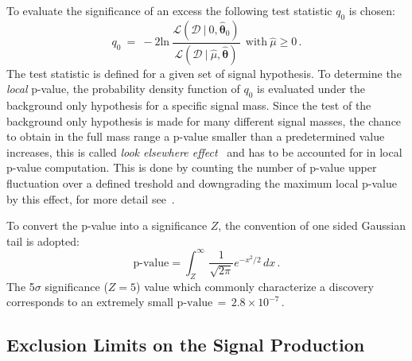 To evaluate the significance of an excess the following  test statistic $q_0$ is chosen:
\begin{equation}
q_0 ~ = ~  -2 \text{ln} ~ \frac{\mathcal{L}(\mathcal{D}~|~0, \hat{\boldsymbol{\theta}}_{0})}{\mathcal{L}(\mathcal{D} ~| ~ \hat{\mu}, \hat{\boldsymbol{\theta}})}
 ~ ~ \text{with} ~  \hat{\mu} \ge 0\,.
\end{equation}
The test statistic is defined for a given set of signal hypothesis. To determine the \emph{local} p-value,
the probability density function of $q_0$ is evaluated under the background only hypothesis for a specific signal mass.  
Since the test of the background only hypothesis is made for many different signal masses, the chance to obtain in the full
mass range a p-value smaller than a predetermined value increases, this is called \emph{look elsewhere effect}~\cite{LEE}
and has to be accounted for in local p-value computation. This is done by counting the number of p-value upper fluctuation over
a defined treshold and downgrading the maximum local p-value by this effect, for more detail see~\cite{lhclimits,LEE}.

To convert the p-value into a significance $Z$, the convention of one sided Gaussian tail is adopted:
\begin{equation}
\text{p-value} = \int_Z^\infty \, \frac{1}{\sqrt{2\pi}} e^{-x^2/2} \, dx \,.
\end{equation}
The 5$\sigma$ significance ($Z = 5$) value which  commonly characterize a discovery corresponds to an 
extremely  small $\text{p-value}\,=\, 2.8 \times 10^{-7}\,.$



\subsection{Exclusion Limits on the Signal Production}


